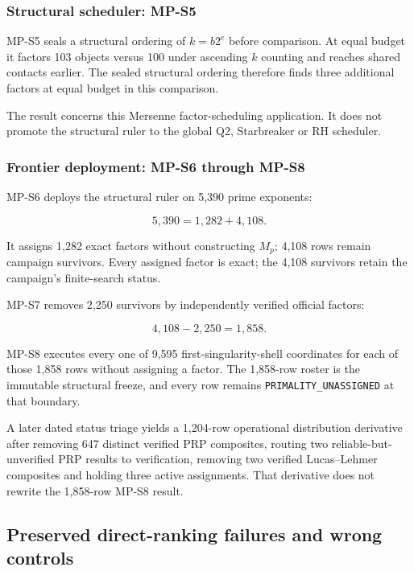 \subsubsection{Structural scheduler:
MP-S5}\label{viii-ch10-structural-scheduler-mp-s5}

MP-S5 seals a structural ordering of \(k=b2^e\) before comparison. At
equal budget it factors 103 objects versus 100 under ascending \(k\)
counting and reaches shared contacts earlier. The sealed structural ordering therefore finds three additional factors at equal budget in this comparison.

The result concerns this Mersenne factor-scheduling application. It does
not promote the structural ruler to the global Q2, Starbreaker or RH
scheduler.

\subsubsection{Frontier deployment: MP-S6 through
MP-S8}\label{viii-ch10-frontier-deployment-mp-s6-through-mp-s8}

MP-S6 deploys the structural ruler on 5,390 prime exponents:

\[
5{,}390=1{,}282+4{,}108.
\]

It assigns 1,282 exact factors without constructing \(M_p\); 4,108 rows
remain campaign survivors. Every assigned factor is exact; the 4,108 survivors retain the campaign's finite-search status.

MP-S7 removes 2,250 survivors by independently verified official
factors:

\[
4{,}108-2{,}250=1{,}858.
\]

MP-S8 executes every one of 9,595 first-singularity-shell coordinates
for each of those 1,858 rows without assigning a factor. The 1,858-row
roster is the immutable structural freeze, and every row remains
\texttt{PRIMALITY\_UNASSIGNED} at that boundary.

A later dated status triage yields a 1,204-row operational distribution
derivative after removing 647 distinct verified PRP composites, routing
two reliable-but-unverified PRP results to verification, removing two
verified Lucas--Lehmer composites and holding three active assignments.
That derivative does not rewrite the 1,858-row MP-S8 result.

\subsection{Preserved direct-ranking failures and wrong
controls}\label{viii-ch10-preserved-direct-ranking-failures-and-wrong-controls}

